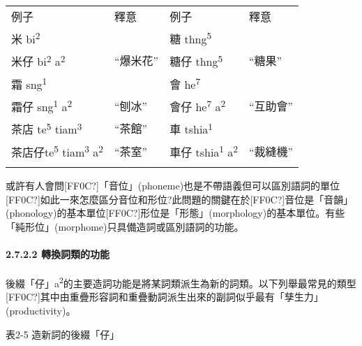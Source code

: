 \tablefirsthead{}

\tabletail{}
\tablelasttail{}
\begin{tabularx}{\textwidth}{XXXX}
\lsptoprule

 例子 & 釋意 & 例子 & 釋意\\
{\sffamily \textrm{米 bi}\textrm{\textsuperscript{2}}} &  & {\sffamily \textrm{糖 thng}\textrm{\textsuperscript{5}}} & \\
{\sffamily \textrm{米仔 bi}\textrm{\textsuperscript{2}} \textrm{a}\textrm{\textsuperscript{2}}} & “爆米花” & {\sffamily \textrm{糖仔 thng}\textrm{\textsuperscript{5}}} & “糖果”\\
{\sffamily \textrm{霜 sng}\textrm{\textsuperscript{1}}} &  & {\sffamily \textrm{會 he}\textrm{\textsuperscript{7}}} & \\
{\sffamily \textrm{霜仔 sng}\textrm{\textsuperscript{1}} \textrm{a}\textrm{\textsuperscript{2}}} & “刨冰” & {\sffamily \textrm{會仔 he}\textrm{\textsuperscript{7}} \textrm{a}\textrm{\textsuperscript{2}}} & “互助會”\\
{\sffamily \textrm{茶店 te}\textrm{\textsuperscript{5}} \textrm{tiam}\textrm{\textsuperscript{3}}} & “茶館” & {\sffamily \textrm{車 tshia}\textrm{\textsuperscript{1}}} & \\
{\sffamily \textrm{茶店仔te}\textrm{\textsuperscript{5}} \textrm{tiam}\textrm{\textsuperscript{3}} \textrm{a}\textrm{\textsuperscript{2}}} & “茶室” & {\sffamily \textrm{車仔 tshia}\textrm{\textsuperscript{1}} \textrm{a}\textrm{\textsuperscript{2}}} & “裁縫機”\\
\lspbottomrule
\end{tabularx}
\textrm{或許有人會問[FF0C?]「音位」(phoneme)也是不帶語義但可以區別語詞的單位[FF0C?]如此一來怎麼區分音位和形位?此問題的關鍵在於[FF0C?]音位是「音韻」(phonology)的基本單位[FF0C?]形位是「形態」(morphology)的基本單位。有些「純形位」(morphome)只具備造詞或區別語詞的功能。}

\paragraph{2.7.2.2 轉換詞類的功能}

\textrm{後綴「仔」a}\textrm{\textsuperscript{2}}\textrm{的主要造詞功能是將某詞類派生為新的詞類。以下列舉最常見的類型[FF0C?]其中由重疊形容詞和重疊動詞派生出來的副詞似乎最有「孳生力」(productivity)}。

\rmfamily
表2-5 造新詞的後綴「仔」

\tablefirsthead{}

